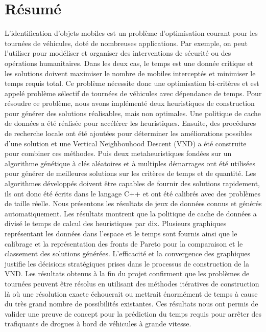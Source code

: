 \section*{Résumé}

L'identification d'objets mobiles est un problème d'optimisation courant pour les tournées de véhicules, doté de nombreuses applications. Par exemple, on peut l'utiliser pour modéliser et organiser des interventions de sécurité ou des opérations humanitaires. Dans les deux cas, le temps est une donnée critique et les solutions doivent maximiser le nombre de mobiles interceptés et minimiser le temps requis total. Ce problème nécessite donc une optimisation bi-critères et est appelé problème sélectif de tournées de véhicules avec dépendance de temps. Pour résoudre ce problème, nous avons implémenté deux \glspl{heuristique} de construction pour générer des solutions réalisables, mais non optimales. Une politique de cache de données a été réalisée pour accélérer les heuristiques. Ensuite, des procédures de recherche locale ont été ajoutées pour déterminer les améliorations possibles d'une solution et une Vertical Neighbouhood Descent (VND) a été construite pour combiner ces méthodes. Puis deux \glspl{metaheuristique} fondées sur un algorithme génétique à clés aléatoires et à multiples démarrages ont été utilisées pour générer de meilleures solutions sur les critères de temps et de quantité. Les algorithmes développés doivent être capables de fournir des solutions rapidement, ils ont donc été écrits dans le langage C++ et ont été calibrés avec des problèmes de taille réelle. Nous présentons les résultats de jeux de données connus et générés automatiquement. Les résultats montrent que la politique de cache de données a divisé le temps de calcul des heuristiques par dix. Plusieurs graphiques représentant les données dans l'espace et le temps sont fournis ainsi que le calibrage et la représentation des fronts de Pareto pour la comparaison et le classement des solutions générées. L'efficacité et la convergence des graphiques justifie les décisions stratégiques prises dans le processus de construction de la VND. Les résultats obtenus à la fin du projet confirment que les problèmes de tournées peuvent être résolus en utilisant des méthodes itératives de construction là où une résolution exacte échouerait ou mettrait énormément de temps à cause du très grand nombre de possibilités existantes. Ces résultats nous ont permis de valider une preuve de concept pour la prédiction du temps requis pour arrêter des trafiquants de drogues à bord de véhicules à grande vitesse.

